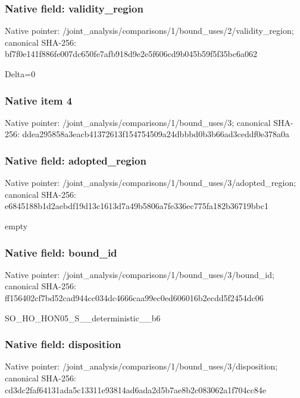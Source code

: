 \documentclass[10pt,a4paper]{article}
\begin{document}
\subsubsection{Native field: validity\_\allowbreak{}region}
Native pointer: /joint\_\allowbreak{}analysis/comparisons/1/bound\_\allowbreak{}uses/2/validity\_\allowbreak{}region; canonical SHA-256: bf7f0e141f886fe007dc650fe7afb918d9e2e5f606cd9b045b59f5f35bc6a062

\begingroup\raggedright\sloppy Delta=\allowbreak{}0\par\endgroup

\subsubsection{Native item 4}
Native pointer: /joint\_\allowbreak{}analysis/comparisons/1/bound\_\allowbreak{}uses/3; canonical SHA-256: ddea295858a3eacb41372613f154754509a24dbbbd0b3b66ad3ceddf0e378a0a

\subsubsection{Native field: adopted\_\allowbreak{}region}
Native pointer: /joint\_\allowbreak{}analysis/comparisons/1/bound\_\allowbreak{}uses/3/adopted\_\allowbreak{}region; canonical SHA-256: e6845188b1d2aebdf19d13c1613d7a49b5806a7fe336ec775fa182b36719bbc1

\begingroup\raggedright\sloppy empty\par\endgroup

\subsubsection{Native field: bound\_\allowbreak{}id}
Native pointer: /joint\_\allowbreak{}analysis/comparisons/1/bound\_\allowbreak{}uses/3/bound\_\allowbreak{}id; canonical SHA-256: ff156402cf7bd52cad944cc034dc4666caa99ec0ed606016b2ecdd5f2454dc06

\begingroup\raggedright\sloppy SO\_\allowbreak{}HO\_\allowbreak{}HON05\_\allowbreak{}S\_\allowbreak{}\_\allowbreak{}deterministic\_\allowbreak{}\_\allowbreak{}b6\par\endgroup

\subsubsection{Native field: disposition}
Native pointer: /joint\_\allowbreak{}analysis/comparisons/1/bound\_\allowbreak{}uses/3/disposition; canonical SHA-256: cd3dc2faf64131ada5c13311e93814ad6ada2d5b7ae8b2c083062a1f704cc84e
\end{document}
